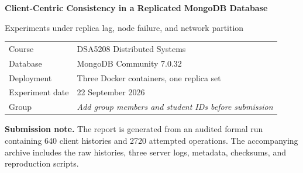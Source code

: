 \documentclass[11pt,a4paper]{article}
\newcommand{\groupmembers}{\textit{Add group members and student IDs before submission}}
\begin{document}
\begin{titlepage}
  \color{navy}
  \vspace*{22mm}
  {\Huge\bfseries Client-Centric Consistency in a Replicated MongoDB Database\par}
  \vspace{7mm}
  {\Large Experiments under replica lag, node failure, and network partition\par}
  \vspace{18mm}
  \begin{tabular}{@{}ll@{}}
    Course & DSA5208 Distributed Systems\\
    Database & MongoDB Community 7.0.32\\
    Deployment & Three Docker containers, one replica set\\
    Experiment date & 22 September 2026\\
    Group & \groupmembers
  \end{tabular}
  \vfill
  \color{black}
  \textbf{Submission note.} The report is generated from an audited formal run containing
  640 client histories and 2720 attempted operations. The accompanying archive includes the
  raw histories, three server logs, metadata, checksums, and reproduction scripts.
\end{titlepage}

\begin{abstract}
This project evaluates four client-centric consistency properties---read-your-writes,
monotonic reads, monotonic writes, and writes-follow-reads---in a three-member MongoDB
replica set. Eight client configurations form a complete $2\times2\times2$ matrix over
causal history tracking, read concern, and
write concern. The same application history is exercised under seven equally important
operating scenarios: normal operation, deliberate replica lag, secondary failure, primary
failure, a 2+1 network partition, complete 1+1+1 isolation, and partition-induced rollback.
The formal run contains 640 histories and 2720 attempted operations. Normal operation and
single-node failures established the healthy and failover baselines. Replica lag and both
partition patterns exposed the difference between stale successful reads and operations
that wait or fail to preserve causal order. The rollback scenario exposed the durability
consequences of acknowledged $w:1$ writes. Across the full matrix, the observations agree
with the predicted client-centric guarantees and demonstrate that consistency and
availability must be interpreted together.
\end{abstract}
\end{document}
